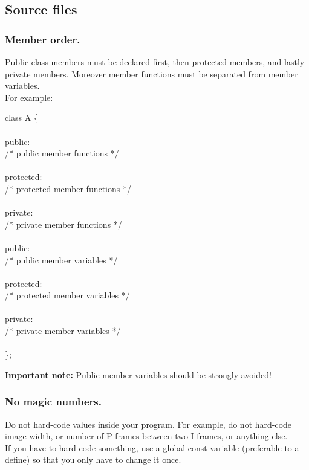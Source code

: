 \subsection{Source files}
\subsubsection{Member order.}
Public class members must be declared first, then protected members,
and lastly private members. Moreover member functions must be
separated from member variables.\\

For example:
\begin{algorithm}[H]
class A \{ \\
\\
public: \\
/* public member functions */ \\
 \\
protected: \\
/* protected member functions */ \\
 \\
private: \\
/* private member functions */ \\
 \\
public: \\
/* public member variables */ \\
 \\
protected: \\
/* protected member variables */ \\
 \\
private: \\
/* private member variables */ \\
 \\
\};
\end{algorithm}
{\bf Important note: } Public member variables should be strongly avoided!

\subsubsection{No magic numbers.}
Do not hard-code values inside your program. For example, do not
hard-code image width, or number of P frames between two I frames, or
anything else.\\
If you have to hard-code something, use a global const variable
(preferable to a define) so that you only have to change it once.\\

